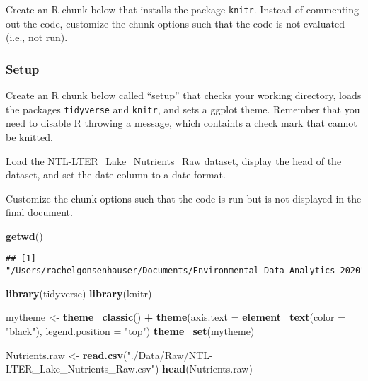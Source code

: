 \documentclass[]{article}
\newenvironment{Shaded}{\begin{snugshade}}{\end{snugshade}}
\newcommand{\DataTypeTok}[1]{\textcolor[rgb]{0.13,0.29,0.53}{#1}}
\newcommand{\KeywordTok}[1]{\textcolor[rgb]{0.13,0.29,0.53}{\textbf{#1}}}
\newcommand{\NormalTok}[1]{#1}
\newcommand{\OperatorTok}[1]{\textcolor[rgb]{0.81,0.36,0.00}{\textbf{#1}}}
\newcommand{\StringTok}[1]{\textcolor[rgb]{0.31,0.60,0.02}{#1}}
\begin{document}
Create an R chunk below that installs the package \texttt{knitr}.
Instead of commenting out the code, customize the chunk options such
that the code is not evaluated (i.e., not run).

\hypertarget{setup}{%
\subsubsection{Setup}\label{setup}}

Create an R chunk below called ``setup'' that checks your working
directory, loads the packages \texttt{tidyverse} and \texttt{knitr}, and
sets a ggplot theme. Remember that you need to disable R throwing a
message, which containts a check mark that cannot be knitted.

Load the NTL-LTER\_Lake\_Nutrients\_Raw dataset, display the head of the
dataset, and set the date column to a date format.

Customize the chunk options such that the code is run but is not
displayed in the final document.

\begin{Shaded}
\begin{Highlighting}[]
\KeywordTok{getwd}\NormalTok{()}
\end{Highlighting}
\end{Shaded}

\begin{verbatim}
## [1] "/Users/rachelgonsenhauser/Documents/Environmental_Data_Analytics_2020"
\end{verbatim}

\begin{Shaded}
\begin{Highlighting}[]
\KeywordTok{library}\NormalTok{(tidyverse)}
\KeywordTok{library}\NormalTok{(knitr)}

\NormalTok{mytheme <-}\StringTok{ }\KeywordTok{theme_classic}\NormalTok{() }\OperatorTok{+}
\StringTok{  }\KeywordTok{theme}\NormalTok{(}\DataTypeTok{axis.text =} \KeywordTok{element_text}\NormalTok{(}\DataTypeTok{color =} \StringTok{"black"}\NormalTok{), }
        \DataTypeTok{legend.position =} \StringTok{"top"}\NormalTok{)}
\KeywordTok{theme_set}\NormalTok{(mytheme)}

\NormalTok{Nutrients.raw <-}\StringTok{ }\KeywordTok{read.csv}\NormalTok{(}\StringTok{"./Data/Raw/NTL-LTER_Lake_Nutrients_Raw.csv"}\NormalTok{)}
\KeywordTok{head}\NormalTok{(Nutrients.raw)}
\end{Highlighting}
\end{Shaded}
\end{document}
